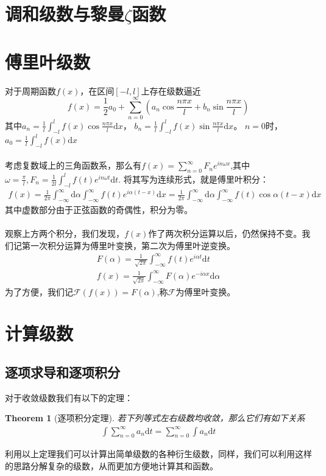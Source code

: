 \documentclass[12pt,a4paper,UTF8]{ctexbook}
\theoremstyle{plain}
\newtheorem{theorem}{\indent Theorem}[section]
\begin{document}
\section{调和级数与黎曼$\zeta$函数}
\section{傅里叶级数}
对于周期函数$f(x)$，在区间$[-l,l]$上存在级数逼近
\begin{equation}
f(x)=\frac{1}{2}a_0+\sum_{n=0}^\infty (a_n\cos\frac{n\pi x}{l}+b_n\sin\frac{n\pi x}{l})
\end{equation}
其中$a_n=\frac{1}{l}\int_{-l}^l f(x)\cos\frac{n\pi x}{l}\mathrm d x$，
$b_n=\frac{1}{l}\int_{-l}^l f(x)\sin\frac{n\pi x}{l}\mathrm d x$。
$n=0$时，$a_0=\frac{1}{l}\int_{-l}^l f(x)\mathrm d x$
\paragraph{}考虑复数域上的三角函数系，那么有$f(x)=\sum_{n=0}^\infty F_n e^{in\omega x}$,其中$\omega =\frac{\pi}{l},F_n=\frac{1}{2l}\int_{-l}^lf(t)e^{in\omega t}\mathrm d t.$
将其写为连续形式，就是傅里叶积分：
\begin{align*}
    f(x)=\frac{1}{2\pi}\int_{-\infty}^\infty\mathrm d \alpha\int^\infty_{-\infty}f(t)e^{i\alpha (t-x)}\mathrm d x=\frac{1}{2\pi}\int_{-\infty}^\infty\mathrm d \alpha\int^\infty_{-\infty}f(t)\cos\alpha(t-x)\mathrm d x
\end{align*}
其中虚数部分由于正弦函数的奇偶性，积分为零。
\paragraph{}观察上方两个积分，我们发现，$f(x)$作了两次积分运算以后，仍然保持不变。我们记第一次积分运算为傅里叶变换，第二次为傅里叶逆变换。
\begin{align*}
    & F(\alpha)=\frac{1}{\sqrt{2\pi}}\int_{-\infty}^\infty f(t)e^{i\alpha t}\mathrm d t &\\
    & f(x)=\frac{1}{\sqrt{2\pi}}\int_{-\infty}^\infty F(\alpha)e^{-i\alpha x}\mathrm d \alpha &
\end{align*}
为了方便，我们记$\mathcal F(f(x))=F(\alpha)$,称$\mathcal F$为傅里叶变换。
\section{计算级数}
\subsection{逐项求导和逐项积分}
对于收敛级数我们有以下的定理：
\begin{theorem}[逐项积分定理]
    若下列等式左右级数均收敛，那么它们有如下关系
\begin{align*} 
    \int \sum_{n=0}^\infty a_n \mathrm d t= \sum_{n=0}^\infty \int a_n \mathrm d t
\end{align*} 
\end{theorem}
利用以上定理我们可以计算出简单级数的各种衍生级数，同样，我们可以利用这样的思路分解复杂的级数，从而更加方便地计算其和函数。
\end{document}
